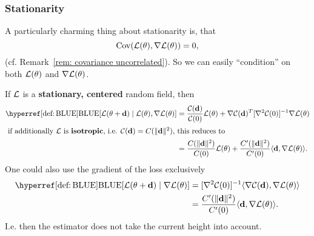 \subsubsection{Stationarity}

A particularly charming thing about stationarity is, that
\[
	\operatorname{Cov}(\mathcal{L}(\theta), \nabla\mathcal{L}(\theta))=0,
\]
(cf. Remark~\ref{rem: covariance uncorrelated}). So we can easily ``condition''
on both \(\mathcal{L}(\theta)\) and \(\nabla\mathcal{L}(\theta)\).

\begin{lemma}
	If \(\mathcal{L}\) is a \textbf{stationary, centered} random field, then
	\begin{align*}
		\BLUE[\Loss(\param + \step)\mid \Loss(\param), \nabla\Loss(\param)]
		&= \frac{\C(\step)}{\C(0)} \Loss(\param)
		+ \nabla\C(\step)^T [\nabla^2\C(0)]^{-1} \nabla\Loss(\param)
	\\
	\intertext{
		if additionally \(\Loss\) is \textbf{isotropic}, i.e.
		\(\C(\step)=\iC(\|\step\|^2)\), this reduces to
	}
		&= \frac{\iC(\|\step\|^2)}{\iC(0)} \Loss(\param)
		+ \frac{\iC'(\|\step\|^2)}{\iC'(0)} \langle \step, \nabla\Loss(\param)\rangle.
	\end{align*}
	One could also use the gradient of the loss exclusively
	\begin{align*}
		\BLUE[\Loss(\param + \step)\mid \nabla\Loss(\param)]
		&= [\nabla^2\C(0)]^{-1}\langle\nabla\C(\step), \nabla\Loss(\param)\rangle\\
		&= \frac{\iC'(\|\step\|^2)}{\iC'(0)}\langle \step, \nabla\Loss(\param)\rangle.
	\end{align*}
	I.e. then the estimator does not take the current height into account.
\end{lemma}
